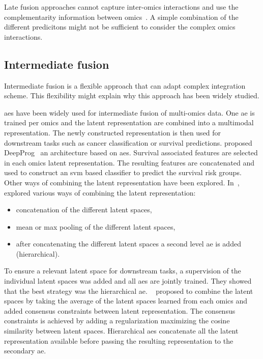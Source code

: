 \documentclass[../main.tex]{subfiles}
\begin{document}
		Late fusion approaches cannot capture inter-omics interactions and use the complementarity information between omics~\cite{Picard2021}.
		A simple combination of the different predicitons might not be sufficient to consider the complex omics interactions.

	\subsection{Intermediate fusion}
		Intermediate fusion is a flexible approach that can adapt complex integration scheme.
		This flexibility might explain why this approach has been widely studied.

		\Glspl{ae} have been widely used for intermediate fusion of multi-omics data.
		One \gls{ae} is trained per omics and the latent representation are combined into a multimodal representation.
		The newly constructed representation is then used for downstream tasks such as cancer classification or survival predictions.
		\citeauthor{DeepProg} proposed DeepProg~\cite{DeepProg} an architecture based on \glspl{ae}.
		Survival associated features are selected in each omics latent representation.
		The resulting features are concatenated and used to construct an \gls{svm} based classifier to predict the survival risk groups.
		Other ways of combining the latent representation have been explored.
		In~\cite{Wissel2021}, \citeauthor{Wissel2021} explored various ways of combining the latent representation:
		\begin{itemize}[nosep]
			\item concatenation of the different latent spaces,
			\item mean or max pooling of the different latent spaces,
			\item after concatenating the different latent spaces a second level \gls{ae} is added (hierarchical).
		\end{itemize}
		To ensure a relevant latent space for downstream tasks, a supervision of the individual latent spaces was added and all \glspl{ae} are jointly trained.
		They showed that the best strategy was the hierarchical \gls{ae}.
		\citeauthor{Tong2021}~\cite{Tong2021} proposed to combine the latent spaces by taking the average of the latent spaces learned from each omics and added consensus constraints between latent representation.
		The consensus constraints is achieved by adding a regularization maximizing the cosine similarity between latent spaces.
		Hierarchical \glspl{ae} concatenate all the latent representation available before passing the resulting representation to the secondary \gls{ae}.
\end{document}
